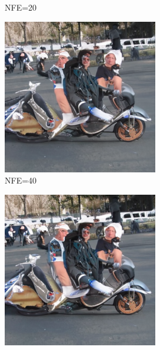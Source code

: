 \documentclass{article}
\begin{document}
\begin{figure}
\begin{subfigure}[b]{0.19\linewidth}
    \caption*{NFE=20}
    \end{subfigure}
    \begin{subfigure}[b]{0.19\linewidth}
    \includegraphics[width=\linewidth]{figures/imagenet256/solver_samples/imagenet256_fm_ot_17_20.png}
    \caption*{NFE=40}
    \end{subfigure}
    \begin{subfigure}[b]{0.19\linewidth}
    \includegraphics[width=\linewidth]{figures/imagenet256/solver_samples/imagenet256_fm_ot_17_30.png}

\end{subfigure}
\end{figure}
\end{document}

